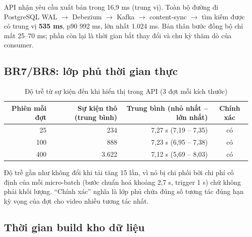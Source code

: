 API nhận yêu cầu xuất bản trong 16,9 ms (trung vị). Toàn bộ đường đi PostgreSQL WAL $\rightarrow$ Debezium $\rightarrow$ Kafka $\rightarrow$ content-sync $\rightarrow$ tìm kiếm được có trung vị \textbf{535 ms}, p90 992 ms, lớn nhất 1.024 ms. Bản thân bước đồng bộ chỉ mất 25--70 ms; phần còn lại là thời gian bắt thay đổi và chu kỳ thăm dò của consumer.

\subsection{BR7/BR8: lớp phủ thời gian thực}

\begin{table}[H]
\centering\small
\caption{Độ trễ từ sự kiện đến khi hiển thị trong API (3 đợt mỗi kích thước)}\label{tab:live}
\begin{tabular}{@{}rrrc@{}}
\toprule
\textbf{Phiên mỗi đợt} & \textbf{Sự kiện thô (trung bình)} & \textbf{Trung bình (nhỏ nhất -- lớn nhất)} & \textbf{Chính xác} \\
\midrule
25 & 234 & 7,27 s (7,19 -- 7,35) & có \\
100 & 888 & 7,23 s (6,95 -- 7,38) & có \\
400 & 3.622 & 7,12 s (5,69 -- 8,03) & có \\
\bottomrule
\end{tabular}
\end{table}

Độ trễ gần như không đổi khi tải tăng 15 lần, vì nó bị chi phối bởi chi phí cố định của mỗi micro-batch (bước chuẩn hoá khoảng 2,7 s, trigger 1 s) chứ không phải khối lượng. ``Chính xác'' nghĩa là lớp phủ chứa đúng số tương tác đúng hạn kỳ vọng của đợt cho video nhiều tương tác nhất.

\subsection{Thời gian build kho dữ liệu}

